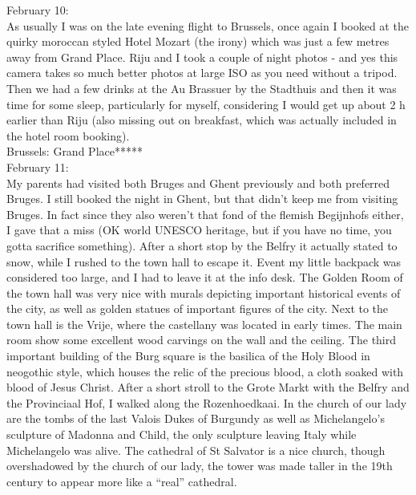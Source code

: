 February 10:\\
As usually I was on the late evening flight to Brussels, once again I booked at the quirky moroccan styled Hotel Mozart (the irony) which was just a few metres away from Grand Place. Riju and I took a couple of night photos - and yes this camera takes so much better photos at large ISO as you need without a tripod. Then we had a few drinks at the Au Brassuer by the Stadthuis and then it was time for some sleep, particularly for myself, considering I would get up about 2 h earlier than Riju (also missing out on breakfast, which was actually included in the hotel room booking).\\

Brussels: Grand Place*****\\

February 11:\\
My parents had visited both Bruges and Ghent previously and both preferred Bruges. I still booked the night in Ghent, but that didn't keep me from visiting Bruges. In fact since they also weren't that fond of the flemish Begijnhofs either, I gave that a miss (OK world UNESCO heritage, but if you have no time, you gotta sacrifice something). After a short stop by the Belfry it actually stated to snow, while I rushed to the town hall to escape it. Event my little backpack was considered too large, and I had to leave it at the info desk. The Golden Room of the town hall was very nice with murals depicting important historical events of the city, as well as golden statues of important figures of the city. Next to the town hall is the Vrije, where the castellany was located in early times. The main room show some excellent wood carvings on the wall and the ceiling. The third important building of the Burg square is the basilica of the Holy Blood in neogothic style, which houses the relic of the precious blood, a cloth soaked with blood of Jesus Christ. After a short stroll to the Grote Markt with the Belfry and the Provinciaal Hof, I walked along the Rozenhoedkaai. In the church of our lady are the tombs of the last Valois Dukes of Burgundy as well as Michelangelo's sculpture of Madonna and Child, the only sculpture leaving Italy while Michelangelo was alive. The cathedral of St Salvator is a nice church, though overshadowed by the church of our lady, the tower was made taller in the 19th century to appear more like a ``real'' cathedral.\\
